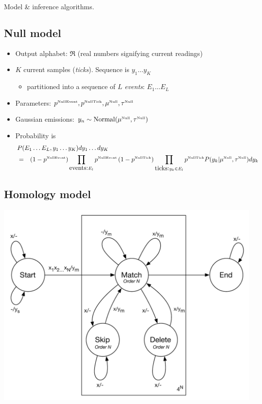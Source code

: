 \documentclass[10pt]{article}
\newcommand{\seclabel}[1]{\label{sec:#1}}
\begin{document}
Model \& inference algorithms.

\newcommand\paramlabel[1]{\mbox{\tiny #1}}

\subsection{Null model}

\begin{itemize}
\item Output alphabet: $\Re$ (real numbers signifying current readings)
\item $K$ current samples ({\em ticks}). Sequence is $y_1 \ldots y_K$
 \begin{itemize}
 \item partitioned into a sequence of $L$ {\em events}: $E_1 \ldots E_L$
 \end{itemize}
\item Parameters: $p^{\paramlabel{NullEvent}},p^{\paramlabel{NullTick}},\mu^{\paramlabel{Null}},\tau^{\paramlabel{Null}}$
\item Gaussian emissions: $y_n \sim \mbox{Normal}(\mu^{\paramlabel{Null}},\tau^{\paramlabel{Null}})$
\item Probability is
\begin{eqnarray*}
  \lefteqn{P(E_1 \ldots E_L, y_1 \ldots y_K) dy_1 \ldots dy_K} \\
& = & \left( 1 - p^{\paramlabel{NullEvent}} \right)
\prod_{\mbox{events:} E_l} p^{\paramlabel{NullEvent}} \left( 1 - p^{\paramlabel{NullTick}} \right)
\prod_{\mbox{ticks:} y_k \in E_l} p^{\paramlabel{NullTick}} P(y_k|\mu^{\paramlabel{Null}},\tau^{\paramlabel{Null}}) dy_k
\end{eqnarray*}
\end{itemize}


\subsection{Homology model}
\seclabel{HomologyModel}

\includegraphics[width=\textwidth]{figs/Transducer.pdf}
\end{document}
